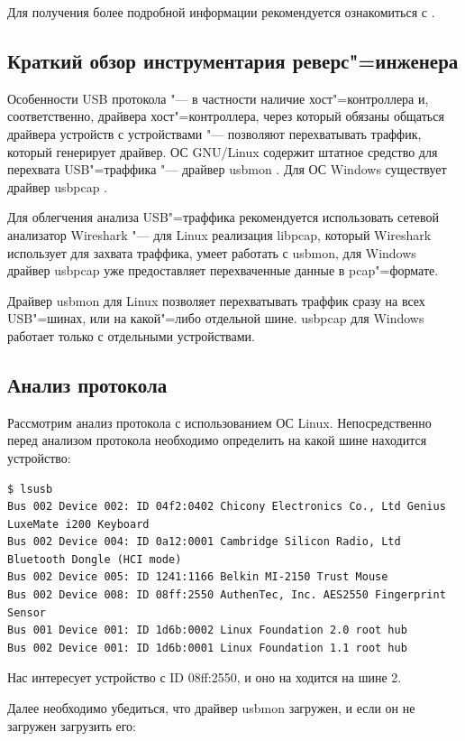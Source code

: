 \documentclass[10pt, a5paper]{article}
\begin{document}
Для получения более подробной информации рекомендуется ознакомиться с \cite{Anar1}.

\subsection*{Краткий обзор инструментария реверс"=инженера}

Особенности USB протокола "--- в частности наличие хост"=контроллера и, соответственно, драйвера хост"=контроллера, через который обязаны общаться драйвера устройств с устройствами "--- позволяют перехватывать траффик, который генерирует драйвер. ОС GNU/Linux содержит штатное средство для перехвата USB"=траффика "--- драйвер usbmon \cite{Anar2}. Для ОС Windows существует драйвер usbpcap \cite{Anar3}.

Для облегчения анализа USB"=траффика рекомендуется использовать сетевой анализатор Wireshark "--- для Linux реализация libpcap, который Wireshark использует для захвата траффика, умеет работать с usbmon, для Windows драйвер usbpcap уже предоставляет перехваченные данные в pcap"=формате.

Драйвер usbmon для Linux позволяет перехватывать траффик сразу на всех USB"=шинах, или на какой"=либо отдельной шине. \linebreak usbpcap для Windows работает только с отдельными устройствами.

\subsection*{Анализ протокола}

Рассмотрим анализ протокола с использованием ОС Linux. Непосредственно перед анализом протокола необходимо определить на какой шине находится устройство:

\begin{verbatim}
$ lsusb
Bus 002 Device 002: ID 04f2:0402 Chicony Electronics Co., Ltd Genius LuxeMate i200 Keyboard
Bus 002 Device 004: ID 0a12:0001 Cambridge Silicon Radio, Ltd Bluetooth Dongle (HCI mode)
Bus 002 Device 005: ID 1241:1166 Belkin MI-2150 Trust Mouse
Bus 002 Device 008: ID 08ff:2550 AuthenTec, Inc. AES2550 Fingerprint Sensor
Bus 001 Device 001: ID 1d6b:0002 Linux Foundation 2.0 root hub
Bus 002 Device 001: ID 1d6b:0001 Linux Foundation 1.1 root hub
\end{verbatim}
Нас интересует устройство с ID 08ff:2550, и оно на ходится на шине 2.

Далее необходимо убедиться, что драйвер usbmon загружен, и если он не загружен загрузить его:
\end{document}
